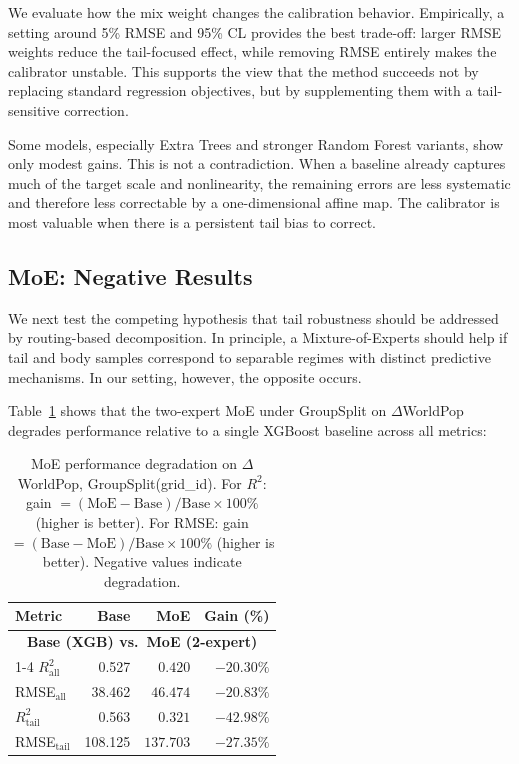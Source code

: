 \documentclass[preprint,12pt]{elsarticle}
\renewcommand{\arraystretch}{1.1}
\begin{document}
We evaluate how the mix weight changes the calibration behavior. Empirically, a setting around 5\% RMSE and 95\% CL provides the best trade-off: larger RMSE weights reduce the tail-focused effect, while removing RMSE entirely makes the calibrator unstable. This supports the view that the method succeeds not by replacing standard regression objectives, but by supplementing them with a tail-sensitive correction.

Some models, especially Extra Trees and stronger Random Forest variants, show only modest gains. This is not a contradiction. When a baseline already captures much of the target scale and nonlinearity, the remaining errors are less systematic and therefore less correctable by a one-dimensional affine map. The calibrator is most valuable when there is a persistent tail bias to correct.

\subsection{MoE: Negative Results}

We next test the competing hypothesis that tail robustness should be addressed by routing-based decomposition. In principle, a Mixture-of-Experts should help if tail and body samples correspond to separable regimes with distinct predictive mechanisms. In our setting, however, the opposite occurs.

Table~\ref{tab:dwp_gs_moe_drop} shows that the two-expert MoE under GroupSplit on $\Delta$WorldPop degrades performance relative to a single XGBoost baseline across all metrics:

\begin{table}[htbp]
\centering
\small
\setlength{\tabcolsep}{5pt}
\renewcommand{\arraystretch}{1.10}
\caption{MoE performance degradation on $\Delta$WorldPop, GroupSplit(grid\_id). For $R^2$: gain $= (\text{MoE}-\text{Base})/\text{Base} \times 100\%$ (higher is better). For RMSE: gain $= (\text{Base}-\text{MoE})/\text{Base} \times 100\%$ (higher is better). Negative values indicate degradation.}
\label{tab:dwp_gs_moe_drop}
\begin{tabular}{lrrr}
\toprule
\textbf{Metric} & \textbf{Base} & \textbf{MoE} & \textbf{Gain (\%)} \\
\midrule

\multicolumn{4}{c}{\textbf{Base (XGB) vs.\ MoE (2-expert)}} \\
\cmidrule(lr){1-4}
$R^2_{\mathrm{all}}$    & 0.527   & $0.420$  & $-20.30\%$ \\
RMSE$_{\mathrm{all}}$   & 38.462  & $46.474$   & $-20.83\%$ \\
$R^2_{\mathrm{tail}}$   & 0.563   & $0.321$  & $-42.98\%$ \\
RMSE$_{\mathrm{tail}}$  & 108.125 & $137.703$  & $-27.35\%$ \\

\bottomrule
\end{tabular}
\end{table}
\end{document}
